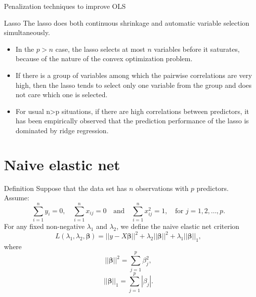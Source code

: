     \begin{frame}{Penalization techniques to improve OLS}
    \begin{block}{Lasso}
        The lasso does both continuous shrinkage and automatic variable selection simultaneously.
        \begin{itemize}
            \item In the $p>n$ case, the lasso selects at most $n$ variables before it saturates, because of the nature of the convex optimization problem.
            \item If there is a group of variables among which the pairwise correlations are very high, then the lasso tends to select only one variable from the group and does not care which one is selected.
            \item For usual n>p situations, if there are high correlations between predictors, it has been empirically observed that the prediction performance of the lasso is dominated by ridge regression.
        \end{itemize}
    \end{block} 
    \end{frame}

\section{Naive elastic net}
    \begin{frame}{Definition}
    Suppose that the data set has $n$ observations with $p$ predictors. Assume:
    \begin{equation}
        \sum_{i=1}^{n} y_i = 0, \quad \sum_{i=1}^{n} x_{ij} = 0 \quad \text{and} \quad \sum_{i=1}^{n} x_{ij}^2 = 1, \quad \text{for } j = 1,2,\ldots,p.
    \end{equation}
     For any fixed non-negative $\lambda_1$ and $\lambda_2$, we define the naive elastic net criterion
     \begin{equation}
         L(\lambda_1, \lambda_2, \boldsymbol{\beta}) = ||y - X\boldsymbol{\beta}||^2 + \lambda_2 ||\boldsymbol{\beta}||^2 + \lambda_1 ||\boldsymbol{\beta}||_1,
     \end{equation}
     where
     \[
||\boldsymbol{\beta}||^2 = \sum_{j=1}^{p} \beta_j^2,
\]
\[
||\boldsymbol{\beta}||_1 = \sum_{j=1}^{p} |\beta_j|.
\]
    \end{frame}

